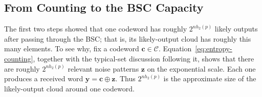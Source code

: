 \subsection{From Counting to the BSC Capacity}

The first two steps showed that one codeword has roughly $2^{nh_2(p)}$ likely outputs after passing through the BSC; that is, its likely-output cloud has roughly this many elements. To see why, fix a codeword $\mathbf{c}\in\mathcal{C}$. Equation~\eqref{eq:entropy-counting}, together with the typical-set discussion following it, shows that there are roughly $2^{nh_2(p)}$ relevant noise patterns $\mathbf{z}$ on the exponential scale. Each one produces a received word $\mathbf{y}=\mathbf{c}\oplus\mathbf{z}$. Thus $2^{nh_2(p)}$ is the approximate size of the likely-output cloud around one codeword.

